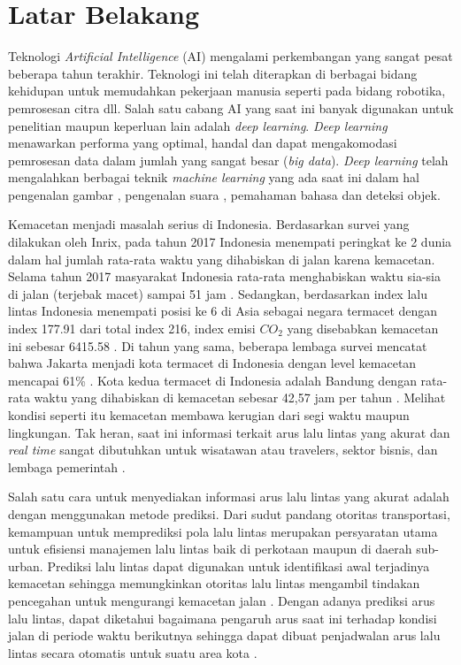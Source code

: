 \documentclass[../thesis.tex]{subfiles}
\begin{document}
\section{Latar Belakang}
Teknologi \textit{Artificial Intelligence} (AI) mengalami perkembangan yang sangat pesat beberapa tahun terakhir. Teknologi ini telah diterapkan di berbagai bidang kehidupan untuk memudahkan pekerjaan manusia seperti pada bidang robotika, pemrosesan citra dll. 
Salah satu cabang AI yang saat ini banyak digunakan untuk penelitian maupun keperluan lain adalah \textit{deep learning}. \textit{Deep learning} menawarkan performa yang optimal, handal dan dapat mengakomodasi pemrosesan data dalam jumlah yang sangat besar (\textit{big data}). 
\textit{Deep learning} telah mengalahkan berbagai teknik \textit{machine learning} yang ada saat ini dalam hal pengenalan gambar \cite{Krizhevsky2002ImageNet}, pengenalan suara \cite{Hinton2012Speech}, pemahaman bahasa \cite{Collobert2011NLP} dan deteksi objek.

Kemacetan menjadi masalah serius di Indonesia. Berdasarkan survei yang dilakukan oleh Inrix, pada tahun 2017 Indonesia menempati peringkat ke 2 dunia dalam hal jumlah rata-rata waktu yang dihabiskan di jalan karena kemacetan. Selama tahun 2017 masyarakat Indonesia rata-rata menghabiskan waktu sia-sia di jalan (terjebak macet) sampai 51 jam \cite{Inrix2017Survei}. Sedangkan, berdasarkan index lalu lintas Indonesia menempati posisi ke 6 di Asia sebagai negara termacet dengan index 177.91 dari total index 216, index emisi $CO_2$ yang disebabkan kemacetan ini sebesar 6415.58 \cite{Numbeo2015Survei}. 
Di tahun yang sama, beberapa lembaga survei mencatat bahwa Jakarta menjadi kota termacet di Indonesia dengan level kemacetan mencapai 61\% \cite{TomTom2017Survei}. Kota kedua termacet di Indonesia adalah Bandung dengan rata-rata waktu yang dihabiskan di kemacetan sebesar 42,57 jam per tahun \cite{Inrix2017Survei}. Melihat kondisi seperti itu kemacetan membawa kerugian dari segi waktu maupun lingkungan.
Tak heran, saat ini informasi terkait arus lalu lintas yang akurat dan \textit{real time} sangat dibutuhkan untuk wisatawan atau travelers, sektor bisnis, dan lembaga pemerintah \cite{Zhang2008DynaCAS}.

Salah satu cara untuk menyediakan informasi arus lalu lintas yang akurat adalah dengan menggunakan metode prediksi. Dari sudut pandang otoritas transportasi, kemampuan untuk memprediksi pola lalu lintas merupakan persyaratan utama untuk efisiensi manajemen lalu lintas baik di perkotaan maupun di daerah sub-urban. Prediksi lalu lintas dapat digunakan untuk identifikasi awal terjadinya kemacetan sehingga memungkinkan otoritas lalu lintas mengambil tindakan pencegahan untuk mengurangi kemacetan
jalan \cite{Djahel2014SmartCity}. Dengan adanya prediksi arus lalu lintas, dapat diketahui bagaimana pengaruh arus saat ini terhadap kondisi jalan di periode waktu berikutnya sehingga dapat dibuat penjadwalan arus lalu lintas secara otomatis untuk suatu area kota \cite{Yuangfang2018TrafficPrediction}.
\end{document}
